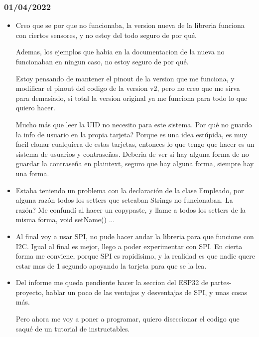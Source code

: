 \documentclass[../informe_krapp.tex]{subfiles}
\begin{document}
\subsubsection{01/04/2022}
\begin{itemize}
	\item Creo que se por que no funcionaba, la version nueva de la libreria funciona
	      con ciertos sensores, y no estoy del todo seguro de por qué.

	      Ademas, los ejemplos que habia en la documentacion de la nueva no funcionaban en ningun
	      caso, no estoy seguro de por qué.

	      Estoy pensando de mantener el pinout de la version que me funciona, y modificar
	      el pinout del codigo de la version v2, pero no creo que me sirva para demasiado, si
	      total la version original ya me funciona para todo lo que quiero hacer.

	      Mucho más que leer la UID no necesito para este sistema. Por qué no guardo la info
	      de usuario en la propia tarjeta? Porque es una idea estúpida, es muy facil
	      clonar cualquiera de estas tarjetas, entonces lo que tengo que hacer es un sistema de
	      usuarios y contraseñas. Deberia de ver si hay alguna forma de no guardar la contraseña
	      en plaintext, seguro que hay alguna forma, siempre hay una forma.

	\item Estaba teniendo un problema con la declaración de la clase Empleado,
	      por alguna razón todos los setters que seteaban Strings no funcionaban. La razón?
	      Me confundí al hacer un copypaste, y llame a todos los setters
	      de la misma forma, void setName() {...}

	\item Al final voy a usar SPI, no pude hacer andar la libreria para que funcione
	      con I2C. Igual al final es mejor, llego a poder experimentar con SPI.
	      En cierta forma me conviene, porque SPI es rapidisimo, y la realidad es que nadie
	      quere estar mas de 1 segundo apoyando la tarjeta para que se la lea.

	\item Del informe me queda pendiente hacer la seccion del ESP32 de partes-proyecto, hablar un poco
	      de las ventajas y desventajas de SPI, y unas cosas más.

	      Pero ahora me voy a poner a programar, quiero diseccionar el
	      codigo que saqué de un tutorial de instructables.


\end{itemize}
\end{document}
